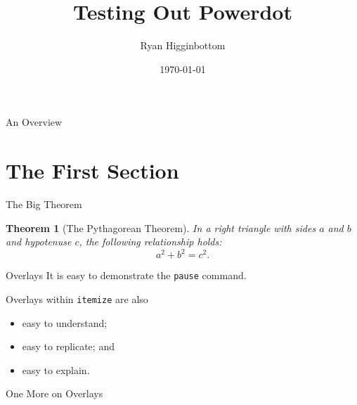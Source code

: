 \documentclass[style=default]{powerdot}
\title{Testing Out Powerdot}
\author{Ryan Higginbottom}
\date{\today}
\theoremstyle{plain}
\newtheorem*{theorem}{Theorem}
\begin{document}
\maketitle

\begin{slide}{An Overview}
\tableofcontents[content=sections]
\end{slide}

\section{The First Section}

\begin{slide}{The Big Theorem}
  \begin{theorem}[The Pythagorean Theorem]
  In a right triangle with sides $a$ and $b$ and hypotenuse $c$, the following relationship holds:
  \[
    a^2+b^2=c^2.
  \]
  \end{theorem}
\end{slide}

\begin{slide}{Overlays}
It is easy to demonstrate \pause the \texttt{pause} command. \pause

\vspace{.2in}

Overlays within \texttt{itemize} are also
\begin{itemize}
\item<4> easy to understand;
\item<5-6> easy to replicate; and
\item<4,6> easy to explain.
\end{itemize}

\end{slide}

\begin{slide}{One More on Overlays}
 

\vspace{.3in}

\Large {}
\normalsize

\vspace{.4in}


\end{slide}
\end{document}
